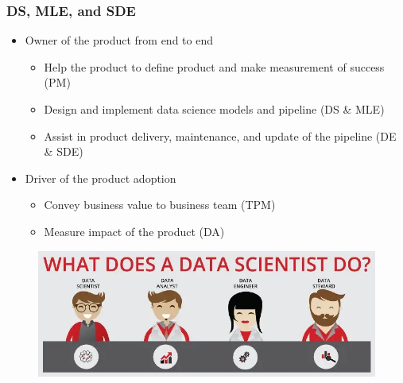 \documentclass[aspectratio=169,xcolor=x11names,table]{beamer}
\begin{document}
\begin{frame}
	\frametitle{DS, MLE, and SDE}
	\begin{itemize}
		\item Owner of the product from end to end
			\begin{itemize}
				\item Help the product to define product and make measurement of success (PM)
				\item Design and implement data science models and pipeline (DS \& MLE)
				\item Assist in product delivery, maintenance, and update of the pipeline (DE \& SDE)
			\end{itemize}
		\item Driver of the product adoption
			\begin{itemize}
				\item Convey business value to business team (TPM)
				\item Measure impact of the product (DA)
			\end{itemize}
	\end{itemize}
	\vfill
	\begin{figure}
		\centering
		\includegraphics[width=0.8\linewidth]{data_scientist}
	\end{figure}
\end{frame}
\end{document}

